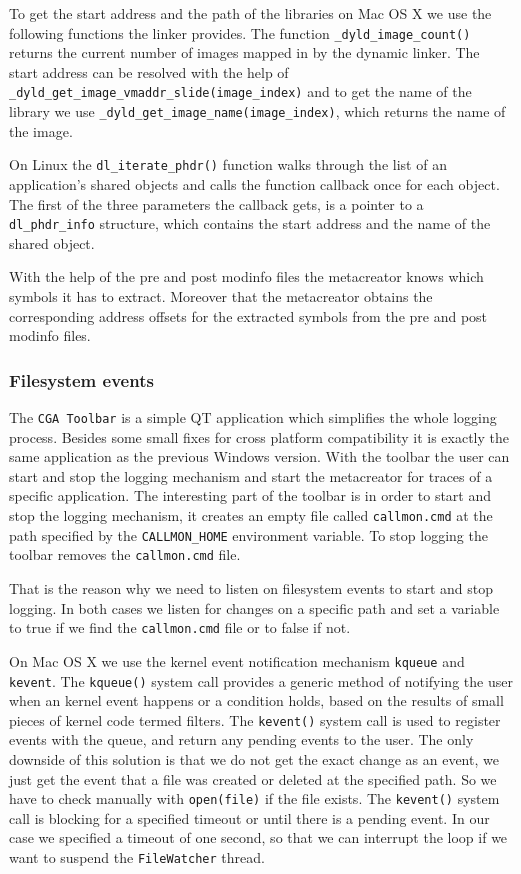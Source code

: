 To get the start address and the path of the libraries on Mac OS X we use the following functions the linker provides. The function \verb=_dyld_image_count()= returns the current number of images mapped in by the dynamic linker. The start address can be resolved with the help of \verb=_dyld_get_image_vmaddr_slide(image_index)= and to get the name of the library we use \verb=_dyld_get_image_name(image_index)=, which returns the name of the image.

On Linux the \verb=dl_iterate_phdr()= function walks through the list of an application's shared objects and calls the function callback once for each object. The first of the three parameters the callback gets, is a pointer to a \verb=dl_phdr_info= structure, which contains the start address and the name of the shared object.

With the help of the pre and post modinfo files the metacreator knows which symbols it has to extract. Moreover that the metacreator obtains the corresponding address offsets for the extracted symbols from the pre and post modinfo files.

\subsubsection{Filesystem events}

The \verb=CGA Toolbar= is a simple QT application which simplifies the whole logging process. Besides some small fixes for cross platform compatibility it is exactly the same application as the previous Windows version. With the toolbar the user can start and stop the logging mechanism and start the metacreator for traces of a specific application. The interesting part of the toolbar is in order to start and stop the logging mechanism, it creates an empty file called \verb=callmon.cmd= at the path specified by the \verb=CALLMON_HOME= environment variable. To stop logging the toolbar removes the \verb=callmon.cmd= file.

That is the reason why we need to listen on filesystem events to start and stop logging. In both cases we listen for changes on a specific path and set a variable to true if we find the \verb=callmon.cmd= file or to false if not.

On Mac OS X we use the kernel event notification mechanism \verb=kqueue= and \verb=kevent=. The \verb=kqueue()= system call provides a generic method of notifying the user when an kernel event happens or a condition holds, based on the results of small pieces of kernel code termed filters. The \verb=kevent()= system call is used to register events with the queue, and return any pending events to the user. The only downside of this solution is that we do not get the exact change as an event, we just get the event that a file was created or deleted at the specified path. So we have to check manually with \verb=open(file)= if the file exists. The \verb=kevent()= system call is blocking for a specified timeout or until there is a pending event. In our case we specified a timeout of one second, so that we can interrupt the loop if we want to suspend the \verb=FileWatcher= thread.

